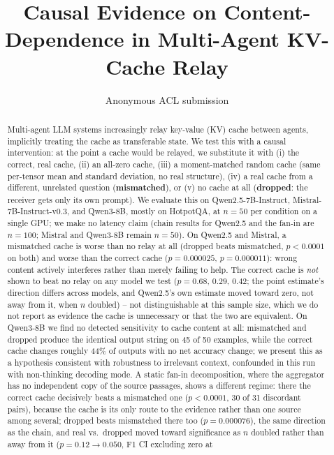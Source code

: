 \documentclass[11pt]{article}
\title{Causal Evidence on Content-Dependence in Multi-Agent KV-Cache Relay}
\author{Anonymous ACL submission}
\begin{document}
\maketitle

\begin{abstract}
Multi-agent LLM systems increasingly relay key-value (KV) cache between
agents, implicitly treating the cache as transferable state. We test
this with a causal intervention: at the point a cache would be
relayed, we substitute it with (i) the correct, real cache, (ii) an
all-zero cache, (iii) a moment-matched random cache (same per-tensor
mean and standard deviation, no real structure), (iv) a real cache from
a different, unrelated question (\textbf{mismatched}), or (v) no cache
at all (\textbf{dropped}: the receiver gets only its own prompt). We
evaluate this on Qwen2.5-7B-Instruct, Mistral-7B-Instruct-v0.3, and
Qwen3-8B, mostly on HotpotQA, at $n=50$ per condition on a single GPU;
we make no latency claim (chain results for Qwen2.5 and the fan-in are
$n=100$; Mistral and Qwen3-8B remain $n=50$). On Qwen2.5 and Mistral, a
mismatched cache is worse than no relay at all (dropped beats
mismatched, $p<0.0001$ on both) and worse than the correct cache
($p=0.000025$, $p=0.000011$): wrong content actively interferes rather
than merely failing to help. The correct cache is \emph{not} shown to
beat no relay on any model we test ($p=0.68$, $0.29$, $0.42$; the point
estimate's direction differs across models, and Qwen2.5's own estimate
moved toward zero, not away from it, when $n$ doubled) -- not
distinguishable at this sample size, which we do not report as evidence
the cache is unnecessary or that the two are equivalent. On Qwen3-8B we
find no detected sensitivity to cache content at all: mismatched and
dropped produce the identical output string on 45 of 50 examples, while
the correct cache changes roughly 44\% of outputs with no net accuracy
change; we present this as a hypothesis consistent with robustness to
irrelevant context, confounded in this run with non-thinking decoding
mode. A static fan-in decomposition, where the aggregator has no
independent copy of the source passages, shows a different regime:
there the correct cache decisively beats a mismatched one
($p<0.0001$, 30 of 31 discordant pairs), because the cache is its only
route to the evidence rather than one source among several; dropped
beats mismatched there too ($p=0.000076$), the same direction as the
chain, and real vs.\ dropped moved toward significance as $n$ doubled
rather than away from it ($p=0.12\to0.050$, F1 CI excluding zero at

\end{abstract}
\end{document}
